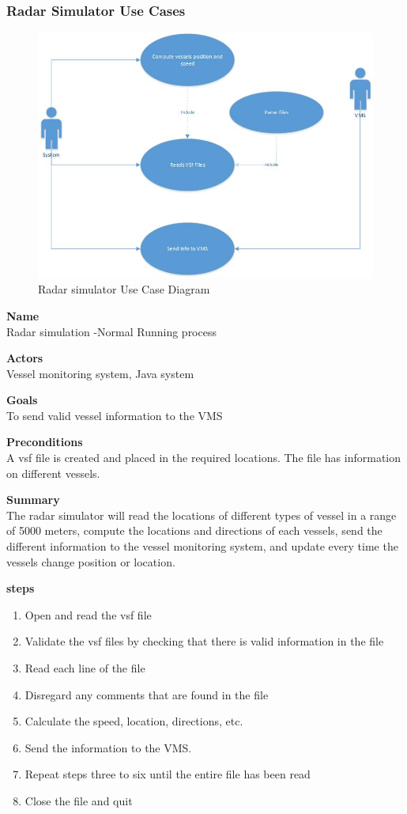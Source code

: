\subsubsection{ Radar Simulator Use Cases}
\begin{figure}[h]
\caption{Radar simulator Use Case Diagram}
\includegraphics[width=1.0\textwidth]{usecasediagram}
\end{figure}

\noindent
{\bf Name}\\
Radar simulation -Normal Running process

\noindent
{\bf Actors}\\
Vessel monitoring system, Java system

\noindent
{\bf Goals}\\
To send valid vessel information to the VMS

\noindent
{\bf Preconditions }\\
A vsf  file is created and placed in the required locations. 
The file has information on different vessels.

\noindent
{\bf Summary }\\
The radar simulator will read the locations of different types of vessel in a range of 5000 meters,
compute the locations and directions of each vessels, send the different information to the vessel monitoring system, and update every time the vessels change position or location.

\noindent
{\bf steps }\\ 
\begin{enumerate}
\item Open and read the vsf file 
\item Validate the vsf files by checking that there is valid information in the file 
\item Read each line of the file 
\item Disregard any comments that are found in the file
\item Calculate the speed, location, directions, etc.
\item Send the information to the VMS.
\item Repeat steps three to six until the entire file has been read
\item Close the file and quit
\end{enumerate} 

